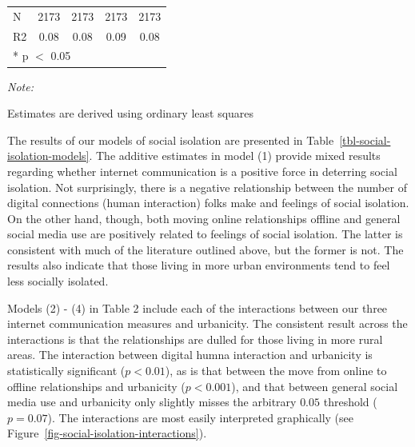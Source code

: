 \documentclass[]{interact}
\theoremstyle{plain}%
\theoremstyle{definition}
\theoremstyle{remark}
\begin{document}
\begin{table}
\begin{threeparttable}
\begin{tabular}[t]{lcccc}
\midrule
N & \num{2173} & \num{2173} & \num{2173} & \num{2173}\\
R2 & \num{0.08} & \num{0.08} & \num{0.09} & \num{0.08}\\
\bottomrule
\multicolumn{5}{l}{\rule{0pt}{1em}* p $<$ 0.05}\\
\end{tabular}
\begin{tablenotes}
\item \textit{Note: } 
\item Estimates are derived using ordinary least squares
\end{tablenotes}
\end{threeparttable}
\end{table}

The results of our models of social isolation are presented in
Table~\ref{tbl-social-isolation-models}. The additive estimates in model
(1) provide mixed results regarding whether internet communication is a
positive force in deterring social isolation. Not surprisingly, there is
a negative relationship between the number of digital connections (human
interaction) folks make and feelings of social isolation. On the other
hand, though, both moving online relationships offline and general
social media use are positively related to feelings of social isolation.
The latter is consistent with much of the literature outlined above, but
the former is not. The results also indicate that those living in more
urban environments tend to feel less socially isolated.

Models (2) - (4) in Table 2 include each of the interactions between our
three internet communication measures and urbanicity. The consistent
result across the interactions is that the relationships are dulled for
those living in more rural areas. The interaction between digital humna
interaction and urbanicity is statistically significant (\(p < 0.01\)),
as is that between the move from online to offline relationships and
urbanicity (\(p < 0.001\)), and that between general social media use
and urbanicity only slightly misses the arbitrary \(0.05\) threshold
(\(p = 0.07\)). The interactions are most easily interpreted graphically
(see Figure~\ref{fig-social-isolation-interactions}).
\end{document}

